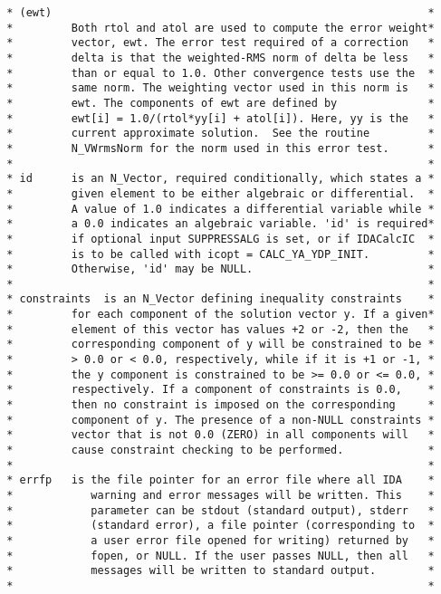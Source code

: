 \documentclass[11pt]{article}
\begin{document}
\begin{verbatim}
 * (ewt)                                                          *
 *         Both rtol and atol are used to compute the error weight*
 *         vector, ewt. The error test required of a correction   *
 *         delta is that the weighted-RMS norm of delta be less   *
 *         than or equal to 1.0. Other convergence tests use the  *
 *         same norm. The weighting vector used in this norm is   *
 *         ewt. The components of ewt are defined by              *
 *         ewt[i] = 1.0/(rtol*yy[i] + atol[i]). Here, yy is the   *
 *         current approximate solution.  See the routine         *
 *         N_VWrmsNorm for the norm used in this error test.      *
 *                                                                *
 * id      is an N_Vector, required conditionally, which states a *
 *         given element to be either algebraic or differential.  *
 *         A value of 1.0 indicates a differential variable while *
 *         a 0.0 indicates an algebraic variable. 'id' is required*
 *         if optional input SUPPRESSALG is set, or if IDACalcIC  *
 *         is to be called with icopt = CALC_YA_YDP_INIT.         *
 *         Otherwise, 'id' may be NULL.                           *
 *                                                                *
 * constraints  is an N_Vector defining inequality constraints    *
 *         for each component of the solution vector y. If a given*
 *         element of this vector has values +2 or -2, then the   *
 *         corresponding component of y will be constrained to be *
 *         > 0.0 or < 0.0, respectively, while if it is +1 or -1, *
 *         the y component is constrained to be >= 0.0 or <= 0.0, *
 *         respectively. If a component of constraints is 0.0,    *
 *         then no constraint is imposed on the corresponding     *
 *         component of y. The presence of a non-NULL constraints *
 *         vector that is not 0.0 (ZERO) in all components will   *
 *         cause constraint checking to be performed.             *
 *                                                                *
 * errfp   is the file pointer for an error file where all IDA    *
 *            warning and error messages will be written. This    *
 *            parameter can be stdout (standard output), stderr   *
 *            (standard error), a file pointer (corresponding to  *
 *            a user error file opened for writing) returned by   *
 *            fopen, or NULL. If the user passes NULL, then all   *
 *            messages will be written to standard output.        *
 *                                                                *

\end{verbatim}
\end{document}
